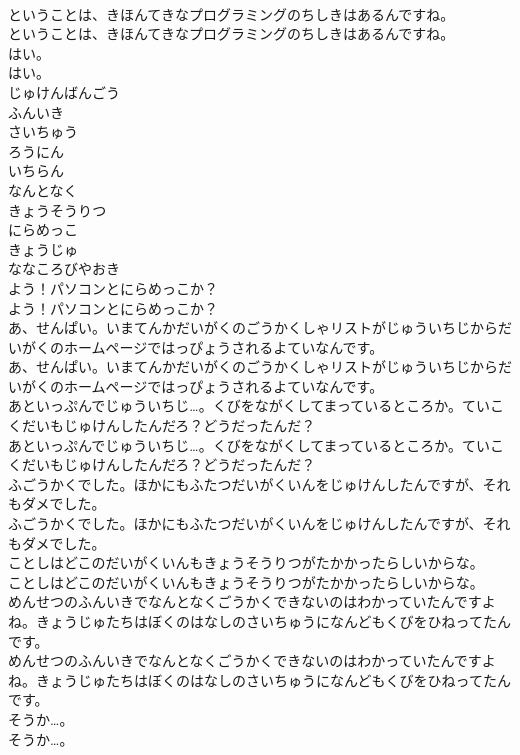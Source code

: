 \documentclass[8pt]{extreport}
\begin{document}
\begin{CJK}{UTF8}{min}
\\	ということは、きほんてきなプログラミングのちしきはあるんですね。
\\	ということは、きほんてきなプログラミングのちしきはあるんですね。
\\	はい。
\\	はい。
\\	じゅけんばんごう
\\	ふんいき
\\	さいちゅう
\\	ろうにん
\\	いちらん
\\	なんとなく
\\	きょうそうりつ
\\	にらめっこ
\\	きょうじゅ
\\	ななころびやおき
\\	よう！パソコンとにらめっこか？
\\	よう！パソコンとにらめっこか？
\\	あ、せんぱい。いまてんかだいがくのごうかくしゃリストがじゅういちじからだいがくのホームページではっぴょうされるよていなんです。
\\	あ、せんぱい。いまてんかだいがくのごうかくしゃリストがじゅういちじからだいがくのホームページではっぴょうされるよていなんです。
\\	あといっぷんでじゅういちじ…。くびをながくしてまっているところか。ていこくだいもじゅけんしたんだろ？どうだったんだ？
\\	あといっぷんでじゅういちじ…。くびをながくしてまっているところか。ていこくだいもじゅけんしたんだろ？どうだったんだ？
\\	ふごうかくでした。ほかにもふたつだいがくいんをじゅけんしたんですが、それもダメでした。
\\	ふごうかくでした。ほかにもふたつだいがくいんをじゅけんしたんですが、それもダメでした。
\\	ことしはどこのだいがくいんもきょうそうりつがたかかったらしいからな。
\\	ことしはどこのだいがくいんもきょうそうりつがたかかったらしいからな。
\\	めんせつのふんいきでなんとなくごうかくできないのはわかっていたんですよね。きょうじゅたちはぼくのはなしのさいちゅうになんどもくびをひねってたんです。
\\	めんせつのふんいきでなんとなくごうかくできないのはわかっていたんですよね。きょうじゅたちはぼくのはなしのさいちゅうになんどもくびをひねってたんです。
\\	そうか…。
\\	そうか…。

\end{CJK}
\end{document}
